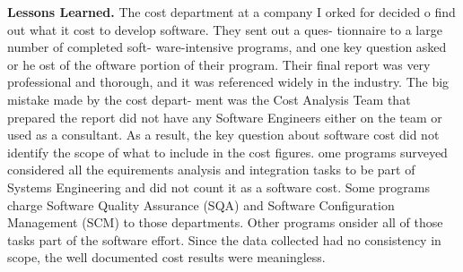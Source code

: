 \documentclass{book}
\begin{document}
\begin{multicols}{2}
\textbf{Lessons Learned.} The cost department at a
company I orked for decided o find out what
it cost to develop software. They sent out a ques-
tionnaire to a large number of completed soft-
ware-intensive programs, and one key question
asked or he ost of the oftware portion of their
program. Their final report was very professional
and thorough, and it was referenced widely in
the industry.
The big mistake made by the cost depart-
ment was the Cost Analysis Team that prepared
the report did not have any Software Engineers
either on the team or used as a consultant. As a
result, the key question about software cost did
not identify the scope of what to include in the
cost figures. ome programs surveyed considered
all the equirements analysis and integration
tasks to be part of Systems Engineering and did
not count it as a software cost. Some programs
charge Software Quality Assurance (SQA) and
Software Configuration Management (SCM) to
those departments. Other programs onsider all
of those tasks part of the software effort. Since the
data collected had no consistency in scope, the
well documented cost results were meaningless.


\end{multicols}
\end{document}
